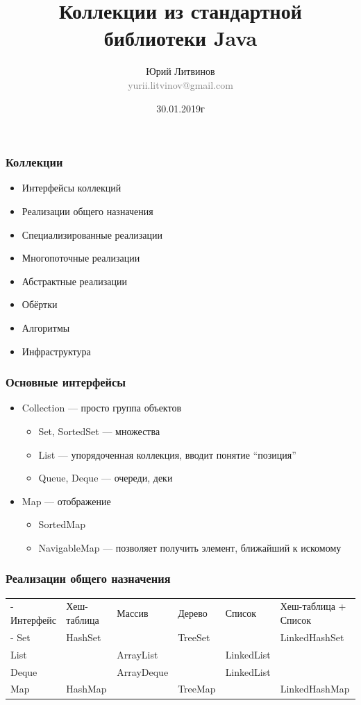 \documentclass[xetex,mathserif,serif]{beamer}
\title{Коллекции из стандартной библиотеки Java}
\author[Юрий Литвинов]{Юрий Литвинов\\\small{\textcolor{gray}{yurii.litvinov@gmail.com}}}
\date{30.01.2019г}
\begin{document}
	\frame{\titlepage}

	\begin{frame}
		\frametitle{Коллекции}
		\begin{itemize}
			\item Интерфейсы коллекций
			\item Реализации общего назначения
			\item Специализированные реализации
			\item Многопоточные реализации
			\item Абстрактные реализации
			\item Обёртки
			\item Алгоритмы
			\item Инфраструктура
		\end{itemize}
	\end{frame}

	\begin{frame}
		\frametitle{Основные интерфейсы}
		\begin{itemize}
			\item Collection --- просто группа объектов
			\begin{itemize}
				\item Set, SortedSet --- множества
				\item List --- упорядоченная коллекция, вводит понятие ``позиция''
				\item Queue, Deque --- очереди, деки
			\end{itemize}
			\item Map --- отображение
			\begin{itemize}
				\item SortedMap
				\item NavigableMap --- позволяет получить элемент, ближайший к искомому
			\end{itemize}
		\end{itemize}
	\end{frame}

	\begin{frame}
		\frametitle{Реализации общего назначения}
		\begin{footnotesize}
			\begin{tabu} {| X[1 l p] | X[0.7 l p] | X[1 l p] | X[0.7 l p] | X[1 l p] | X[1.3 l p] |}
				\tabucline-
				Интерфейс  & Хеш-таблица  & Массив      & Дерево   & Список      & Хеш-таблица + Список  \\
				\tabucline-
				\everyrow{\tabucline-}
				Set        & HashSet      &             & TreeSet  &             & LinkedHashSet         \\
				List       &              & ArrayList   &          & LinkedList  &                       \\
				Deque      &              & ArrayDeque  &          & LinkedList  &                       \\
				Map        & HashMap      &             & TreeMap  &             & LinkedHashMap         \\
			\end{tabu}
		\end{footnotesize}
	\end{frame}
\end{document}
